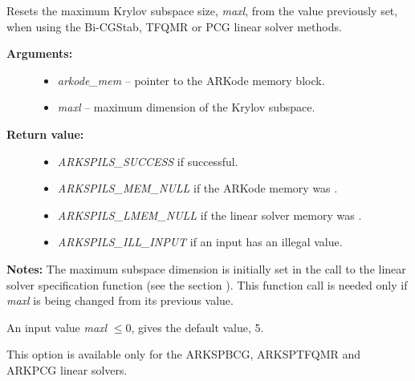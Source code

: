 \documentclass[letterpaper,10pt,english]{sphinxmanual}
\begin{document}
\begin{fulllineitems}
\label{c_interface/User_callable:c.ARKSpilsSetMaxl}
Resets the maximum Krylov subspace size, \emph{maxl}, from the value
previously set, when using the Bi-CGStab, TFQMR or PCG linear
solver methods.
\begin{description}
\item[{\textbf{Arguments:}}] \leavevmode\begin{itemize}
\item {} 
\emph{arkode\_mem} -- pointer to the ARKode memory block.

\item {} 
\emph{maxl} -- maximum dimension of the Krylov subspace.

\end{itemize}

\item[{\textbf{Return value:}}] \leavevmode\begin{itemize}
\item {} 
\emph{ARKSPILS\_SUCCESS} if successful.

\item {} 
\emph{ARKSPILS\_MEM\_NULL} if the ARKode memory was .

\item {} 
\emph{ARKSPILS\_LMEM\_NULL} if the linear solver memory was .

\item {} 
\emph{ARKSPILS\_ILL\_INPUT} if an input has an illegal value.

\end{itemize}

\end{description}

\textbf{Notes:} The maximum subspace dimension is initially set in the
call to the linear solver specification function (see the section
{\hyperref[c_interface/User_callable:cinterface-linearsolvers]{\emph{}}}).  This function call is needed
only if \emph{maxl} is being changed from its previous value.

An input value \emph{maxl} \(\le 0\), gives the default value, 5.

This option is available only for the ARKSPBCG, ARKSPTFQMR and
ARKPCG linear solvers.

\end{fulllineitems}
\end{document}
